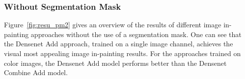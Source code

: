\subsubsection{Without Segmentation Mask}
\label{sssec:num542}

Figure~\ref{fig:resu_pm2} gives an overview of the results of different image in-painting approaches without the use of a segmentation mask. One can see that the Densenet Add approach, trained on a single image channel, achieves the visual most appealing image in-painting results. For the approaches trained on color images, the Densenet Add model performs better than the Densenet Combine Add model.

\begin{table}[H]\begin{center}
\begin{tabular}{ c c c c c c}
 

\end{tabular}
\end{center}
\end{table}
